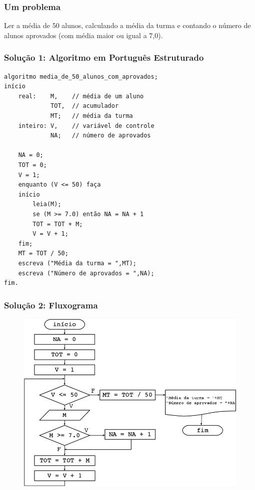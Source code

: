 \documentclass[aspectratio=169]{beamer}
\begin{document}
\begin{frame}\frametitle{Um problema}
Ler a média de 50 alunos, calculando a média da turma e contando o número de alunos aprovados (com média maior ou igual a 7,0).
\end{frame}

\begin{frame}[fragile]\frametitle{Solução 1: Algoritmo em Português Estruturado}

{\tiny\begin{verbatim}
algoritmo media_de_50_alunos_com_aprovados;
início
    real:    M,    // média de um aluno
             TOT,  // acumulador
             MT;   // média da turma
    inteiro: V,    // variável de controle
             NA;   // número de aprovados

    NA = 0;
    TOT = 0;
    V = 1;
    enquanto (V <= 50) faça
    início
        leia(M);
        se (M >= 7.0) então NA = NA + 1
        TOT = TOT + M;
        V = V + 1;
    fim;
    MT = TOT / 50;
    escreva ("Média da turma = ",MT);
    escreva ("Número de aprovados = ",NA);
fim.
\end{verbatim}}
\end{frame}

\begin{frame}\frametitle{Solução 2: Fluxograma}
\begin{figure}[h]
	\centering
	\includegraphics[height=0.65\paperheight]{pucrs-ep-fprog-unidade_01-introducao-laminas-fluxograma.png}
\end{figure}
\end{frame}
\end{document}
